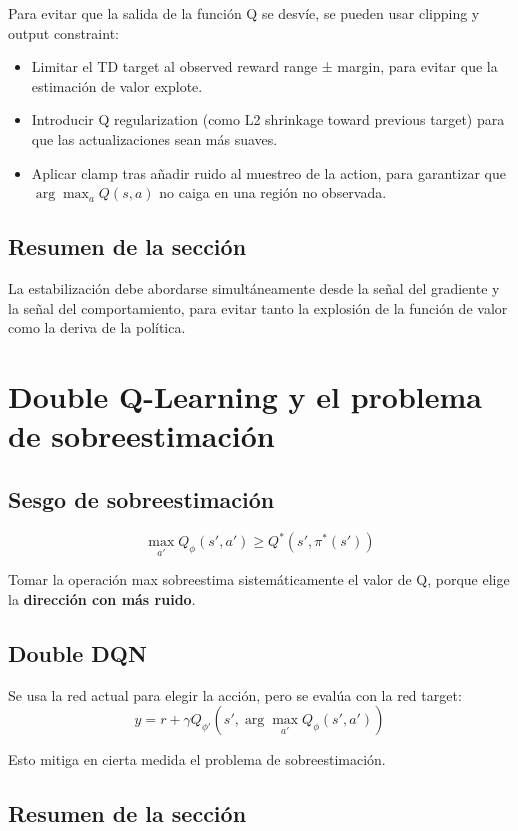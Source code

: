 \documentclass[a4paper]{article}
\begin{document}
Para evitar que la salida de la función Q se desvíe, se pueden usar clipping y output constraint:

\begin{itemize}
    \item Limitar el TD target al observed reward range ± margin, para evitar que la estimación de valor explote.
    \item Introducir Q regularization (como L2 shrinkage toward previous target) para que las actualizaciones sean más suaves.
    \item Aplicar clamp tras añadir ruido al muestreo de la action, para garantizar que $\arg\max_a Q(s,a)$ no caiga en una región no observada.
\end{itemize}

\subsection{Resumen de la sección}

La estabilización debe abordarse simultáneamente desde la señal del gradiente y la señal del comportamiento, para evitar tanto la explosión de la función de valor como la deriva de la política.

\section{Double Q-Learning y el problema de sobreestimación}

\subsection{Sesgo de sobreestimación}

$$\max_{a'} Q_\phi(s', a') \geq Q^*(s', \pi^*(s'))$$

Tomar la operación max sobreestima sistemáticamente el valor de Q, porque elige la \textbf{dirección con más ruido}.

\subsection{Double DQN}

Se usa la red actual para elegir la acción, pero se evalúa con la red target:
$$y = r + \gamma Q_{\phi'}\left(s', \arg\max_{a'} Q_\phi(s', a')\right)$$

Esto mitiga en cierta medida el problema de sobreestimación.

\subsection{Resumen de la sección}
\end{document}
